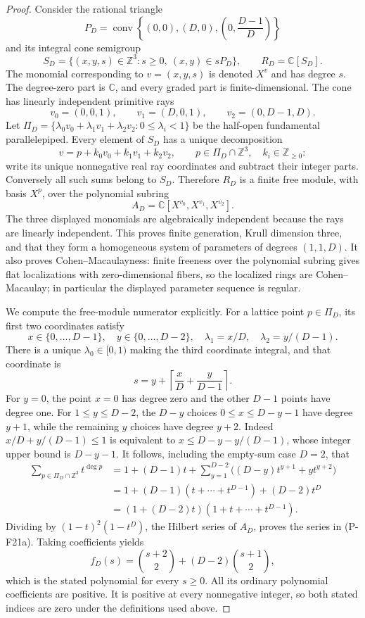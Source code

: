 \documentclass[11pt,a4paper]{article}
\begin{document}
\begin{proof}
Consider the rational triangle
\[
 P_D=\operatorname{conv}\left\{(0,0),(D,0),
           \left(0,\frac{D-1}{D}\right)\right\}
\]
and its integral cone semigroup
\[
 S_D=\{(x,y,s)\in\mathbb Z^3:s\ge0,\ (x,y)\in sP_D\},
 \qquad R_D=\mathbb C[S_D].
\]
The monomial corresponding to $v=(x,y,s)$ is denoted $X^v$ and
has degree $s$. The degree-zero part is $\mathbb C$, and every graded
part is finite-dimensional. The cone has linearly independent
primitive rays
\[
 v_0=(0,0,1),\qquad v_1=(D,0,1),\qquad v_2=(0,D-1,D).
 \tag{P-F21b}
\]
Let $\Pi_D=\{\lambda_0v_0+\lambda_1v_1+\lambda_2v_2:
0\le\lambda_i<1\}$ be the half-open fundamental parallelepiped.
Every element of $S_D$ has a unique decomposition
\[
 v=p+k_0v_0+k_1v_1+k_2v_2,
 \qquad p\in\Pi_D\cap\mathbb Z^3,\quad k_i\in\mathbb Z_{\ge0}:
\]
write its unique nonnegative real ray coordinates and subtract their
integer parts. Conversely all such sums belong to $S_D$.
Therefore $R_D$ is a finite free module, with basis $X^p$, over the
polynomial subring
\[
 A_D=\mathbb C[X^{v_0},X^{v_1},X^{v_2}].
 \tag{P-F21c}
\]
The three displayed monomials are algebraically independent because
the rays are linearly independent. This proves finite generation,
Krull dimension three, and that they form a homogeneous system of
parameters of degrees $(1,1,D)$. It also proves Cohen--Macaulayness:
finite freeness over the polynomial subring gives flat localizations
with zero-dimensional fibers, so the localized rings are
Cohen--Macaulay; in particular the displayed parameter sequence
is regular.

We compute the free-module numerator explicitly. For a lattice point
$p\in\Pi_D$, its first two coordinates satisfy
\[
 x\in\{0,\ldots,D-1\},\quad
 y\in\{0,\ldots,D-2\},\quad
 \lambda_1=x/D,\quad\lambda_2=y/(D-1).
\]
There is a unique $\lambda_0\in[0,1)$ making the third coordinate
integral, and that coordinate is
\[
 s=y+\left\lceil\frac{x}{D}+\frac{y}{D-1}\right\rceil.
\]
For $y=0$, the point $x=0$ has degree zero and the other $D-1$
points have degree one. For $1\le y\le D-2$, the $D-y$ choices
$0\le x\le D-y-1$ have degree $y+1$, while the remaining $y$
choices have degree $y+2$. Indeed $x/D+y/(D-1)\le1$ is equivalent
to $x\le D-y-y/(D-1)$, whose integer upper bound is $D-y-1$.
It follows, including the empty-sum case $D=2$, that
\begin{align*}
 \sum_{p\in\Pi_D\cap\mathbb Z^3}t^{\deg p}
 &=1+(D-1)t+
       \sum_{y=1}^{D-2}\big((D-y)t^{y+1}+yt^{y+2}\big)\\
 &=1+(D-1)(t+\cdots+t^{D-1})+(D-2)t^D\\
 &=(1+(D-2)t)(1+t+\cdots+t^{D-1}).
\end{align*}
Dividing by $(1-t)^2(1-t^D)$, the Hilbert series of $A_D$, proves
the series in (P-F21a). Taking coefficients yields
\[
 f_D(s)=\binom{s+2}{2}+(D-2)\binom{s+1}{2},
\]
which is the stated polynomial for every $s\ge0$. All its ordinary
polynomial coefficients are positive. It is positive at every
nonnegative integer, so both stated indices are zero under the
definitions used above.


\end{proof}
\end{document}
